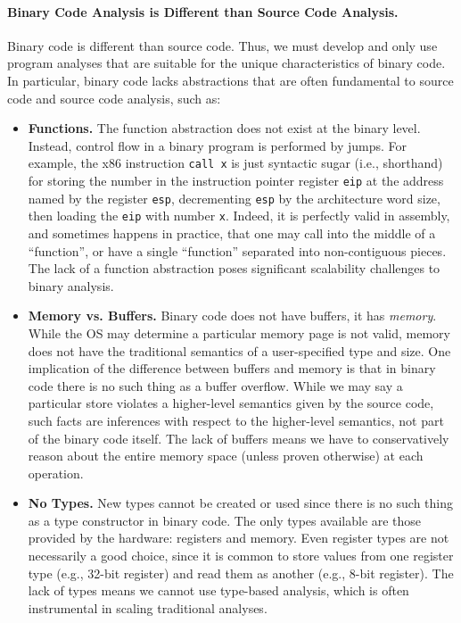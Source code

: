 \paragraph{Binary Code Analysis is Different than Source Code Analysis.}
Binary code is different than source code. Thus, we must develop and
only use program analyses that are suitable for the unique
characteristics of binary code.  In particular, binary code lacks
abstractions that are often fundamental to source code and source code
analysis, such as:
\begin{itemize}\squish
\item {\bf Functions.} The function abstraction does not exist at
  the binary level.  Instead, control flow in a binary program is
  performed by jumps. For example, the x86 instruction {\tt call x} is
  just syntactic sugar (i.e., shorthand) for storing the number in the
  instruction pointer register {\tt eip} at the address named by the
  register {\tt esp}, decrementing {\tt esp} by the architecture word
  size, then loading the {\tt eip} with number {\tt x}. Indeed, it is
  perfectly valid in assembly, and sometimes happens in practice, that
  one may call into the middle of a ``function'', or have a single
  ``function'' separated into non-contiguous pieces. The lack of a
  function abstraction poses significant scalability challenges to
  binary analysis.

\item {\bf Memory vs. Buffers.} Binary code does not have buffers, it
  has \emph{memory}.  While the OS may determine a particular memory
  page is not valid, memory does not have the traditional semantics of
  a user-specified type and size. One implication of the difference
  between buffers and memory is that in binary code there is no such
  thing as a buffer overflow. While we may say a particular store
  violates a higher-level semantics given by the source code, such
  facts are inferences with respect to the higher-level semantics, not
  part of the binary code itself. The lack of buffers means we have to
  conservatively reason about the entire memory space (unless proven
  otherwise) at each operation.

\item {\bf No Types.} New types cannot be created or used since there
  is no such thing as a type constructor in binary code. The only
  types available are those provided by the hardware: registers and
  memory.  Even register types are not necessarily a good choice,
  since it is common to store values from one register type (e.g.,
  32-bit register) and read them as another (e.g., 8-bit
  register). The lack of types means we cannot use type-based
  analysis, which is often instrumental in scaling traditional
  analyses.

\end{itemize}


